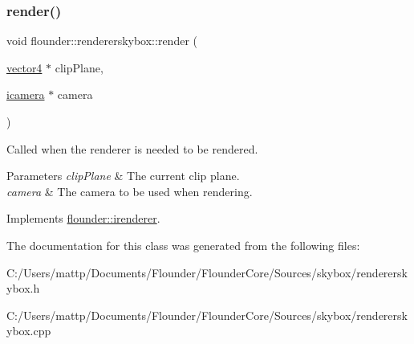 \subsubsection{\texorpdfstring{render()}{render()}}
{\footnotesize\ttfamily void flounder\+::rendererskybox\+::render (\begin{DoxyParamCaption}\item[{\hyperlink{classflounder_1_1vector4}{vector4} $\ast$}]{clip\+Plane,  }\item[{\hyperlink{classflounder_1_1icamera}{icamera} $\ast$}]{camera }\end{DoxyParamCaption})\hspace{0.3cm}{\ttfamily [virtual]}}



Called when the renderer is needed to be rendered. 


\begin{DoxyParams}{Parameters}
{\em clip\+Plane} & The current clip plane. \\
\hline
{\em camera} & The camera to be used when rendering. \\
\hline
\end{DoxyParams}


Implements \hyperlink{classflounder_1_1irenderer_a62a52634ed51582f1c79a4de33e049a3}{flounder\+::irenderer}.



The documentation for this class was generated from the following files\+:\begin{DoxyCompactItemize}
\item 
C\+:/\+Users/mattp/\+Documents/\+Flounder/\+Flounder\+Core/\+Sources/skybox/rendererskybox.\+h\item 
C\+:/\+Users/mattp/\+Documents/\+Flounder/\+Flounder\+Core/\+Sources/skybox/rendererskybox.\+cpp\end{DoxyCompactItemize}
